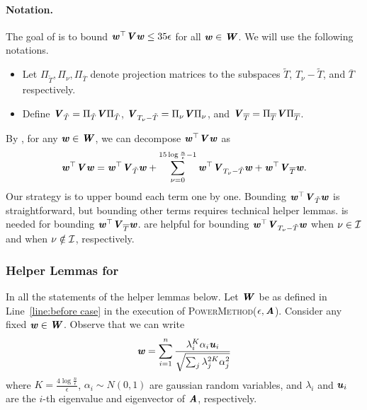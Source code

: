 \paragraph{Notation.}The goal of  is to bound $\ww^{\top}\VV\ww\leq 35 \epsilon$ for all $\ww\in \WW$. We will use the following notations.
\begin{itemize}
    \item Let $\Pi_{\tilde{T}},\Pi_{\nu},\Pi_{\overline{T}}$ denote projection matrices to the subspaces $\tilde{T}$, $T_{\nu}-\tilde{T}$, and $\overline{T}$ respectively.
    \item  Define $\VV_{\tilde{T}} = \Pi_{\tilde{T}}\VV\Pi_{\tilde{T}}$, $\VV_{T_{\nu}-\tilde{T}} = \Pi_{\nu}\VV\Pi_{\nu}$, and $\VV_{\overline{T}} = \Pi_{\overline{T}}\VV\Pi_{\overline{T}}$.
\end{itemize}
By , for any $\ww\in \WW$, we can decompose $\ww^{\top}\VV\ww$  as 
\[
\ww^{\top}\VV\ww = \ww^{\top}\VV_{\tilde{T}}\ww+\sum_{\nu = 0}^{15\log\frac{n}{\epsilon}-1}\ww^{\top}\VV_{T_{\nu} -\tilde{T}}\ww+ \ww^{\top}\VV_{\overline{T}}\ww.
\]
Our strategy is to upper bound each term one by one. Bounding $\ww^{\top}\VV_{\tilde{T}}\ww$ is straightforward, but bounding other terms requires technical helper lemmas.
 is needed for bounding $\ww^{\top}\VV_{\overline{T}}\ww$.
 are helpful for bounding $\ww^{\top}\VV_{T_{\nu} -\tilde{T}}\ww$ when $\nu \in \cal{I}$ and when $\nu \notin \cal{I}$, respectively.


\subsubsection*{Helper Lemmas for }
In all the statements of the helper lemmas below. Let $\WW$ be as defined in Line~\ref{line:before case} in the execution of \textsc{PowerMethod}($\epsilon,\AA$). Consider any fixed $\ww\in\WW$. Observe that we can write 
\begin{equation}\label{eq:rewrite w}  
\ww=\sum_{i=1}^{n}\frac{\lambda_{i}^{K}\alpha_{i}\uu_{i}}{\sqrt{\sum_{j}\lambda_{j}^{2K}\alpha_{j}^{2}}}
\end{equation}
where $K=\frac{4\log\frac{n}{\epsilon}}{\epsilon}$, $\alpha_{i}\sim N(0,1)$ are gaussian random variables, and $\lambda_i$ and $\uu_{i}$ are the $i$-th eigenvalue and eigenvector of $\AA$, respectively.

